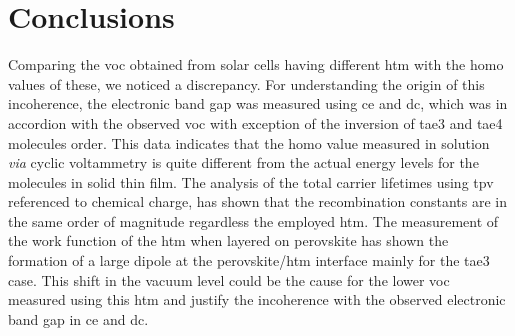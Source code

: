 	\section{Conclusions}
	Comparing the \gls{voc} obtained from solar cells having different \gls{htm} with the \gls{homo} values of these, we noticed a discrepancy.
	For understanding the origin of this incoherence, the electronic band gap was measured using \gls{ce} and \gls{dc}, which was in accordion with the observed \gls{voc} with exception of the inversion of \gls{tae3} and \gls{tae4} molecules order.
	This data indicates that the \gls{homo} value measured in solution \textsl{via} cyclic voltammetry is quite different from the actual energy levels for the molecules in solid thin film.
	The analysis of the total carrier lifetimes using \gls{tpv} referenced to chemical charge, has shown that the recombination constants are in the same order of magnitude regardless the employed \gls{htm}.
	The measurement of the work function of the \gls{htm} when layered on perovskite has shown the formation of a large dipole at the perovskite\-/\gls{htm} interface mainly for the \gls{tae3} case.
	This shift in the vacuum level could be the cause for the lower \gls{voc} measured using this \gls{htm} and justify the incoherence with the observed electronic band gap in \gls{ce} and \gls{dc}.
